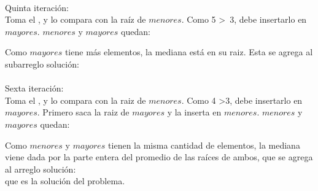 \documentclass[spanish,a4paper]{article}
\begin{document}
\\

Quinta iteración:\\
Toma el , y lo compara con la raíz de $menores$. Como 5 \textgreater\ 3, debe insertarlo en $mayores$. $menores$ y $mayores$ quedan:

 \hspace*{20pt}


Como $mayores$ tiene más elementos, la mediana está en su raiz. Esta se agrega al subarreglo solución:\\

\\

Sexta iteración:\\
Toma el , y lo compara con la raiz de $menores$. Como 4 \textgreater   3, debe insertarlo en $mayores$. Primero saca la raiz de $mayores$ y la inserta en $menores$. $menores$ y $mayores$ quedan:\\

 \hspace*{20pt}

Como $menores$ y $mayores$ tienen la misma cantidad de elementos, la mediana viene dada por la parte entera del promedio de las raíces de ambos, que se agrega al arreglo solución:\\

 \hspace*{3pt} que es la solución del problema. \\
\end{document}
